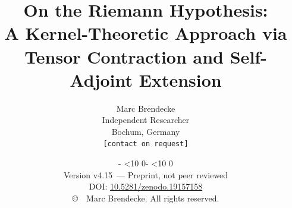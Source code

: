 \documentclass[12pt,a4paper]{article}
\newcommand{\isodatetoday}{%
  \the\year-%
  \ifnum\month<10 0\fi\the\month-%
  \ifnum\day<10 0\fi\the\day}
\newcommand{\paperversion}{v4.15}
\theoremstyle{remark}
\begin{document}

\title{\textbf{On the Riemann Hypothesis:}\\[4pt]
A Kernel-Theoretic Approach via\\
Tensor Contraction and Self-Adjoint Extension}

\author{Marc Brendecke\\[4pt]
\small Independent Researcher\\
\small Bochum, Germany\\[2pt]
\small \texttt{[contact on request]}}

\date{\isodatetoday\\[2pt]
\small\textnormal{Version \paperversion\ --- Preprint, not peer reviewed}\\[4pt]
\small\textnormal{DOI: \href{https://doi.org/10.5281/zenodo.19157158}{10.5281/zenodo.19157158}}\\[4pt]
\small\textnormal{\copyright\ \the\year\ Marc Brendecke. All rights reserved.}}

\maketitle
\thispagestyle{empty}
\end{document}

